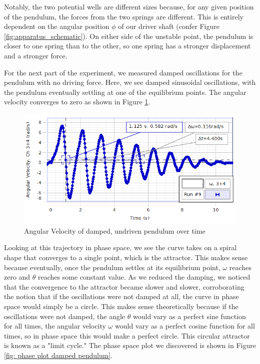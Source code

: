 \documentclass[twocolumn,amsmath,amssymb,pra, floatfix]{revtex4-2}
\begin{document}
Notably, the two potential wells are different sizes because, for any given position of the pendulum, the forces from the two springs are different. This is entirely dependent on the angular position $\phi$ of our driver shaft (confer Figure \ref{fig:apparatus_schematic}). On either side of the unstable point, the pendulum is closer to one spring than to the other, so one spring has a stronger displacement and a stronger force.  

For the next part of the experiment, we measured damped oscillations for the pendulum with no driving force. Here, we see damped sinusoidal oscillations, with the pendulum eventually settling at one of the equilibrium points. The angular velocity converges to zero as shown in Figure \ref{fig: damped undriven pendulum}.

\begin{figure}[H]
    \centering
    \includegraphics[width = 0.7\linewidth]{images/ResonantFreqOmegavsTime.PNG}
    \caption{Angular Velocity of damped, undriven pendulum over time}
    \label{fig: damped undriven pendulum}
\end{figure}

Looking at this trajectory in phase space, we see the curve takes on a spiral shape that converges to a single point, which is the attractor. This makes sense because eventually, once the pendulum settles at its equilibrium point, $\omega$ reaches zero and $\theta$ reaches some constant value. As we reduced the damping, we noticed that the convergence to the attractor became slower and slower, corroborating the notion that if the oscillations were not damped at all, the curve in phase space would simply be a circle. This makes sense theoretically because if the oscillations were not damped, the angle $\theta$ would vary as a perfect sine function for all times, the angular velocity $\omega$ would vary as a perfect cosine function for all times, so in phase space this would make a perfect circle. This circular attractor is known as a "limit cycle." The phase space plot we discovered is shown in Figure \ref{fig: phase plot damped pendulum}.
\end{document}
